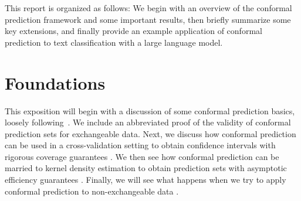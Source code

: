 \documentclass[a4paper, 12pt]{article}
\begin{document}
This report is organized as follows: We begin with an overview of the conformal prediction framework and some important results, then briefly summarize some key extensions, and finally provide an example application of conformal prediction to text classification with a large language model.

\section{Foundations}
\label{sec:foundations}
This exposition will begin with a discussion of some conformal prediction basics, loosely following~\cite{angelopoulosGentleIntroductionConformal2022}.
We include an abbreviated proof of the validity of conformal prediction sets for exchangeable data.
Next, we discuss how conformal prediction can be used in a cross-validation setting to obtain confidence intervals with rigorous coverage guarantees \autocite{barberPredictiveInferenceJackknife2020}.
We then see how conformal prediction can be married to kernel density estimation to obtain prediction sets with asymptotic efficiency
guarantees \autocite{leiDistributionFreePrediction2013}.
Finally, we will see what happens when we try to apply conformal prediction to non-exchangeable data \autocite{barberConformalPredictionExchangeability2023}.
\end{document}
